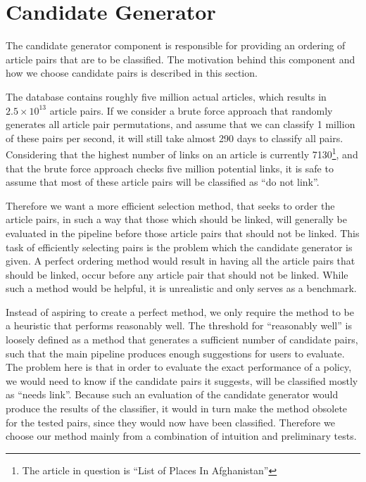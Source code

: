 \section{Candidate Generator}
The candidate generator component is responsible for providing an ordering of article pairs that are to be classified. The motivation behind this component and how we choose candidate pairs is described in this section.

The database contains roughly five million actual articles, which results in $2.5 \times 10^{13}$ article pairs. If we consider a brute force approach that randomly generates all article pair permutations, and assume that we can classify 1 million of these pairs per second, it will still take almost 290 days to classify all pairs. Considering that the highest number of links on an article is currently 7130\footnote{The article in question is \enquote{List of Places In Afghanistan}}, and that the brute force approach checks five million potential links, it is safe to assume that most of these article pairs will be classified as \enquote{do not link}.

Therefore we want a more efficient selection method, that seeks to order the article pairs, in such a way that those which should be linked, will generally be evaluated in the pipeline before those article pairs that should not be linked. This task of efficiently selecting pairs is the problem which the candidate generator is given. A perfect ordering method would result in having all the article pairs that should be linked, occur before any article pair that should not be linked. While such a method would be helpful, it is unrealistic and only serves as a benchmark. 

Instead of aspiring to create a perfect method, we only require the method to be a heuristic that performs reasonably well. The threshold for \enquote{reasonably well} is loosely defined as a method that generates a sufficient number of candidate pairs, such that the main pipeline produces enough suggestions for users to evaluate. The problem here is that in order to evaluate the exact performance of a policy, we would need to know if the candidate pairs it suggests, will be classified mostly as \enquote{needs link}. Because such an evaluation of the candidate generator would produce the results of the classifier, it would in turn make the method obsolete for the tested pairs, since they would now have been classified.  Therefore we choose our method mainly from a combination of intuition and preliminary tests.

